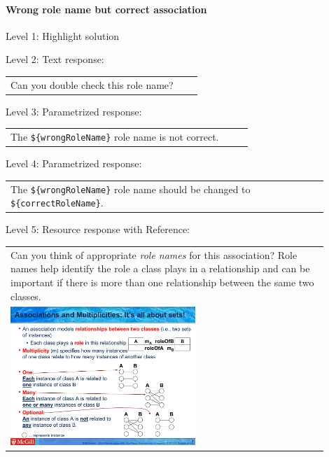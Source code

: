 \paragraph{Wrong role name but correct association}

\noindent Level 1: Highlight solution \medskip

\noindent Level 2: Text response: \medskip

\begin{tabular}{|p{0.9\linewidth}}
Can you double check this role name?
\end{tabular} \medskip

\noindent Level 3: Parametrized response: \medskip

\begin{tabular}{|p{0.9\linewidth}}
The \verb|${wrongRoleName}| role name is not correct.
\end{tabular} \medskip

\noindent Level 4: Parametrized response: \medskip

\begin{tabular}{|p{0.9\linewidth}}
The \verb|${wrongRoleName}| role name should be changed to \verb|${correctRoleName}|.
\end{tabular} \medskip

\noindent Level 5: Resource response with Reference: \medskip

\begin{tabular}{|p{0.9\linewidth}}
Can you think of appropriate \textit{role names}
for this association? Role names help identify the role a class plays in a
relationship and can be important if there is more than one relationship
between the same two classes.

\\
\includegraphics[width=0.6\textwidth]{images/role_name.png}

\end{tabular} \medskip


